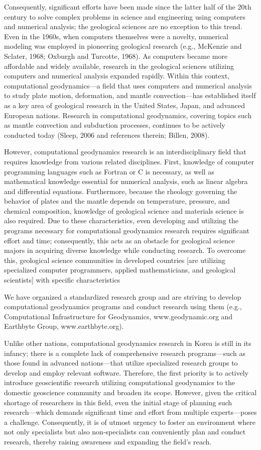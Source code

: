 Consequently, significant efforts have been made since the latter half of the 20th century to solve complex problems in science and engineering using computers and numerical analysis; the geological sciences are no exception to this trend. Even in the 1960s, when computers themselves were a novelty, numerical modeling was employed in pioneering geological research (e.g., McKenzie and Sclater, 1968; Oxburgh and Turcotte, 1968). As computers became more affordable and widely available, research in the geological sciences utilizing computers and numerical analysis expanded rapidly. Within this context, computational geodynamics—a field that uses computers and numerical analysis to study plate motion, deformation, and mantle convection—has established itself as a key area of geological research in the United States, Japan, and advanced European nations. Research in computational geodynamics, covering topics such as mantle convection and subduction processes, continues to be actively conducted today (Sleep, 2006 and references therein; Billen, 2008).


However, computational geodynamics research is an interdisciplinary field that requires knowledge from various related disciplines. First, knowledge of computer programming languages such as Fortran or C is necessary, as well as mathematical knowledge essential for numerical analysis, such as linear algebra and differential equations. Furthermore, because the rheology governing the behavior of plates and the mantle depends on temperature, pressure, and chemical composition, knowledge of geological science and materials science is also required. Due to these characteristics, even developing and utilizing the programs necessary for computational geodynamics research requires significant effort and time; consequently, this acts as an obstacle for geological science majors in acquiring diverse knowledge while conducting research. To overcome this, geological science communities in developed countries [are utilizing specialized computer programmers, applied mathematicians, and geological scientists] with specific characteristics

We have organized a standardized research group and are striving to develop computational geodynamics programs and conduct research using them (e.g., Computational Infrastructure for Geodynamics, www.geodynamic.org and Earthbyte Group, www.earthbyte.org).

Unlike other nations, computational geodynamics research in Korea is still in its infancy; there is a complete lack of comprehensive research programs—such as those found in advanced nations—that utilize specialized research groups to develop and employ relevant software. Therefore, the first priority is to actively introduce geoscientific research utilizing computational geodynamics to the domestic geoscience community and broaden its scope. However, given the critical shortage of researchers in this field, even the initial stage of planning such research—which demands significant time and effort from multiple experts—poses a challenge. Consequently, it is of utmost urgency to foster an environment where not only specialists but also non-specialists can conveniently plan and conduct research, thereby raising awareness and expanding the field's reach.

